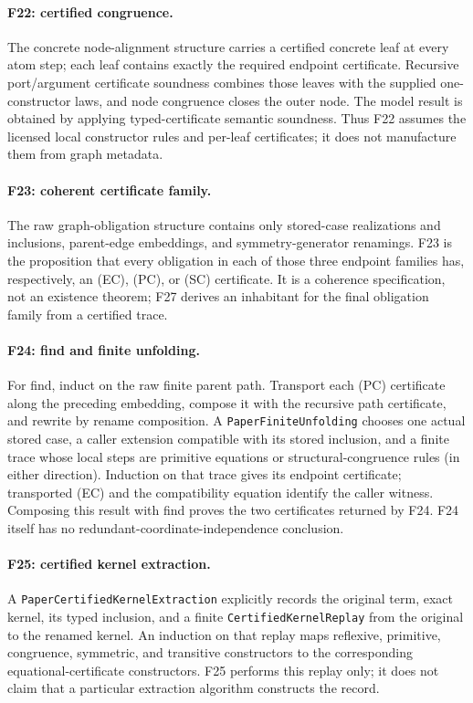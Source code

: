 \paragraph{F22: certified congruence.}
\label{app:proof-F22}
The concrete node-alignment structure carries a certified concrete leaf at
every atom step; each leaf contains exactly the required endpoint
certificate.  Recursive port/argument certificate soundness combines those
leaves with the supplied one-constructor laws, and node congruence closes the
outer node.  The model result is obtained by applying typed-certificate
semantic soundness.  Thus F22 assumes the licensed local constructor rules
and per-leaf certificates; it does not manufacture them from graph metadata.

\paragraph{F23: coherent certificate family.}
\label{app:proof-F23}
The raw graph-obligation structure contains only stored-case realizations and
inclusions, parent-edge embeddings, and symmetry-generator renamings.  F23 is
the proposition that every obligation in each of those three endpoint
families has, respectively, an (EC), (PC), or (SC) certificate.  It is a
coherence specification, not an existence theorem; F27 derives an inhabitant
for the final obligation family from a certified trace.

\paragraph{F24: find and finite unfolding.}
\label{app:proof-F24}
For find, induct on the raw finite parent path.  Transport each (PC)
certificate along the preceding embedding, compose it with the recursive
path certificate, and rewrite by rename composition.  A
\texttt{PaperFiniteUnfolding} chooses one actual stored case, a caller
extension compatible with its stored inclusion, and a finite trace whose
local steps are primitive equations or structural-congruence rules (in either
direction).  Induction on that trace gives its endpoint certificate;
transported (EC) and the compatibility equation identify the caller witness.
Composing this result with find proves the two certificates returned by F24.
F24 itself has no redundant-coordinate-independence conclusion.

\paragraph{F25: certified kernel extraction.}
\label{app:proof-F25}
A \texttt{PaperCertifiedKernelExtraction} explicitly records the original
term, exact kernel, its typed inclusion, and a finite
\texttt{CertifiedKernelReplay} from the original to the renamed kernel.  An
induction on that replay maps reflexive, primitive, congruence, symmetric, and
transitive constructors to the corresponding equational-certificate
constructors.  F25 performs this replay only; it does not claim that a
particular extraction algorithm constructs the record.

